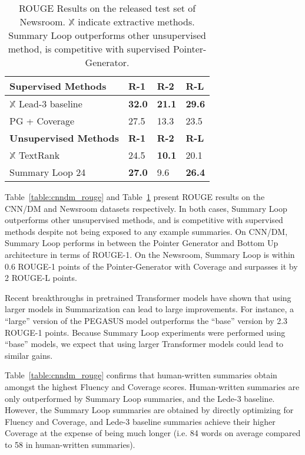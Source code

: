 \documentclass[11pt,a4paper]{article}
\begin{document}
\begin{table}[]
    \begin{tabular}{llll}
    \hline
    \textbf{Supervised Methods}   & \textbf{R-1} & \textbf{R-2} & \textbf{R-L} \\ \hline
    $\mathds{X}$ Lead-3 baseline             & \textbf{32.0}        & \textbf{21.1}        & \textbf{29.6}        \\
    PG + Coverage                 & 27.5        & 13.3        & 23.5        \\ \hline
    \textbf{Unsupervised Methods} & \textbf{R-1} & \textbf{R-2} & \textbf{R-L} \\ \hline
    $\mathds{X}$ TextRank                    & 24.5        & \textbf{10.1}        & 20.1        \\
    Summary Loop 24 & \textbf{27.0}        & 9.6         & \textbf{26.4}        \\ \hline
    \end{tabular}
    \caption{ROUGE Results on the released test set of Newsroom. $\mathds{X}$ indicate extractive methods. Summary Loop outperforms other unsupervised method, is competitive with supervised Pointer-Generator.}
    \label{table:newsroom_rouge}
\end{table}

Table~\ref{table:cnndm_rouge} and Table~\ref{table:newsroom_rouge} present ROUGE results on the CNN/DM and Newsroom datasets respectively. In both cases, Summary Loop outperforms other unsupervised methods, and is competitive with supervised methods despite not being exposed to  any example summaries. On CNN/DM, Summary Loop performs in between the Pointer Generator and Bottom Up architecture in terms of ROUGE-1. On the Newsroom, Summary Loop is within 0.6 ROUGE-1 points of the Pointer-Generator with Coverage and surpasses it by 2 ROUGE-L points.

Recent breakthroughs in pretrained Transformer models have shown that using larger models in Summarization can lead to large improvements. For instance, a ``large'' version of the PEGASUS model \cite{zhang2019pegasus} outperforms the ``base'' version by 2.3 ROUGE-1 points. Because Summary Loop experiments were performed using ``base'' models, we expect that using larger Transformer models could lead to similar gains.

Table~\ref{table:cnndm_rouge} confirms that human-written summaries obtain amongst the highest Fluency and Coverage scores. Human-written summaries are only outperformed by Summary Loop summaries, and the Lede-3 baseline. However, the Summary Loop summaries are obtained by directly optimizing for Fluency and Coverage, and Lede-3 baseline summaries achieve their higher Coverage at the expense of being much longer (i.e. 84 words on average compared to 58 in human-written summaries).
\end{document}
